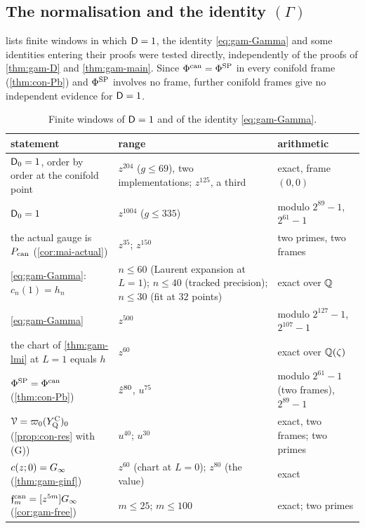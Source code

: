 
\subsection{The normalisation and the identity \texorpdfstring{$(\Gamma)$}{(Gamma)}}
\label{sec:evi-normal}

 lists finite windows in which $\mathsf{D}=1$, the identity \eqref{eq:gam-Gamma} and some identities entering their proofs were tested directly, independently of the proofs of \cref{thm:gam-D} and \cref{thm:gam-main}. Since $\Phi^{\mathrm{can}}=\Phi^{\mathrm{SP}}$ in every conifold frame (\cref{thm:con-Pb}) and $\Phi^{\mathrm{SP}}$ involves no frame, further conifold frames give no independent evidence for $\mathsf{D}=1$.

\begin{table}[ht]
\centering\small
\begin{tabular}{>{\raggedright\arraybackslash}p{}|>{\raggedright\arraybackslash}p{}|>{\raggedright\arraybackslash}p{}}
statement & range & arithmetic\\ \hline
$\mathsf{D}_0=1$, order by order at the conifold point & $z^{204}$ ($g\leq 69$), two implementations; $z^{125}$, a third & exact, frame $(0,0)$\\
$\mathsf{D}_0=1$ & $z^{1004}$ ($g\leq 335$) & modulo $2^{89}-1$, $2^{61}-1$\\
the actual gauge is $P_{\mathrm{can}}$ (\cref{cor:mai-actual}) & $z^{35}$; $z^{150}$ & two primes, two frames\\
\eqref{eq:gam-Gamma}: $c_n(1)=h_n$ & $n\leq 60$ (Laurent expansion at $L=1$); $n\leq 40$ (tracked precision); $n\leq 30$ (fit at $32$ points) & exact over $\mathbb{Q}$\\
\eqref{eq:gam-Gamma} & $z^{500}$ & modulo $2^{127}-1$, $2^{107}-1$\\
the chart of \cref{thm:gam-lmi} at $L=1$ equals $h$ & $z^{60}$ & exact over $\mathbb{Q}(\zeta)$\\
$\Phi^{\mathrm{SP}}=\Phi^{\mathrm{can}}$ (\cref{thm:con-Pb}) & $\hat{z}^{80}$, $u^{75}$ & modulo $2^{61}-1$ (two frames), $2^{89}-1$\\
$\mathcal{V}=\varpi_0(Y^{\mathrm{C}}_{\mathrm{Q}})_0$ (\cref{prop:con-res} with (G)) & $u^{40}$; $u^{30}$ & exact, two frames; two primes\\
$c(z;0)=G_{\infty}$ (\cref{thm:gam-ginf}) & $z^{60}$ (chart at $L=0$); $z^{80}$ (the value) & exact\\
$\mathfrak{f}^{\mathrm{can}}_m=[z^{5m}]G_{\infty}$ (\cref{cor:gam-free}) & $m\leq 25$; $m\leq 100$ & exact; two primes\\
\end{tabular}
\caption{Finite windows of $\mathsf{D}=1$ and of the identity \eqref{eq:gam-Gamma}.}
\label{tab:evi-windows}
\end{table}


